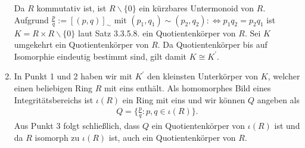 \begin{solution}
\begin{enumerate}
  Da $R$ kommutativ ist, ist $R\backslash\{0\}$ ein kürzbares Untermonoid von $R$.
  Aufgrund $\frac{p}{q} := [(p,q)]_{\sim}$ mit $(p_1,q_1) \sim (p_2,q_2) :\iff p_1q_2 = p_2q_1$
  ist $K = R \times R\backslash\{0\}$ laut Satz 3.3.5.8. ein Quotientenkörper von $R$.
  Sei $K$ umgekehrt ein Quotientenkörper von $R$. Da Quotientenkörper bis auf
  Isomorphie eindeutig bestimmt sind, gilt damit  $K \cong K^{\prime}$.
  \item In Punkt 1 und 2 haben wir mit $K^{\prime}$ den kleinsten Unterkörper von $K$,
  welcher einen beliebigen Ring $R$ mit eins enthält. Als homomorphes Bild eines
  Integritätsbereichs ist $\iota(R)$ ein Ring mit eins und wir können $Q$ angeben als
  \begin{align*}
    Q = \{ \frac{p}{q}: p,q \in \iota(R)\}.
  \end{align*}
  Aus Punkt 3 folgt schließlich, dass $Q$ ein Quotientenkörper von $\iota(R)$ ist
  und da $R$ isomorph zu $\iota(R)$ ist, auch ein Quotientenkörper von $R$.
  \begin{center}
   \\
  \end{center}
\end{enumerate}

\end{solution}
